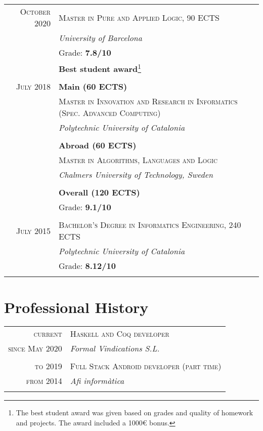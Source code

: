 \documentclass[11pt]{article}
\begin{document}
\begin{tabular}{r|p{11cm}}
  \textsc{October 2020} & \textsc{Master in Pure and Applied Logic, 90 ECTS} \\
 & \emph{University of Barcelona}\\
   & Grade: \textbf{7.8/10} \\
                        & \textbf{Best student award}\footnote{The best student award was given based on grades and quality
                            of homework and projects. The award included a 1000€ bonus.} \\
\multicolumn{2}{c}{} \\

  \textsc{July 2018} & \textbf{Main (60 ECTS)} \\
                        & \textsc{Master in Innovation and Research in Informatics (Spec. Advanced Computing)} \\
                        & \emph{Polytechnic University of Catalonia} \\
                         \\
 & \textbf{Abroad (60 ECTS)}  \\
  & \textsc{Master in Algorithms, Languages and Logic} \\
                        & \emph{Chalmers University of Technology, Sweden} \\
                        \\
                        & \textbf{Overall (120 ECTS)}  \\
                        & Grade: \textbf{9.1/10} \\
  \multicolumn{2}{c}{} \\

  \textsc{July 2015} & \textsc{Bachelor's Degree in Informatics Engineering, 240 ECTS} \\
               & \emph{Polytechnic University of Catalonia}\\
               & Grade: \textbf{8.12/10} \\
  \multicolumn{2}{c}{} \\
\end{tabular}

\section{Professional History}
\vspace{0.2cm}
\begin{tabular}{r|p{11cm}}
  \textsc{current} & \textsc{Haskell and Coq developer} \\
  \textsc{since May 2020} & \emph{Formal Vindications S.L.} \\
  \multicolumn{2}{c}{} \\
  \textsc{to 2019} & \textsc{Full Stack Android developer (part time)} \\
  \textsc{from 2014} & \emph{Afi informàtica} \\
  \multicolumn{2}{c}{} \\

\end{tabular}
\end{document}
